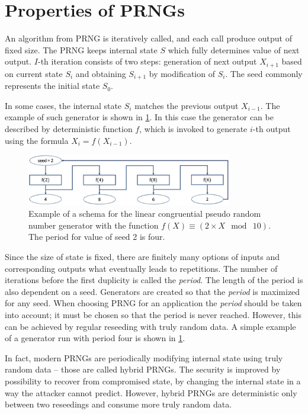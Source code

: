 \documentclass[
    digital,    %
    oneside,    %
    color,
    11pt,
    nocover,
    notable,
    nolof,
    nolot,
    final
]{fithesis3}
\renewcommand\_{\textunderscore\allowbreak}
\begin{document}
\section{Properties of PRNGs}

An algorithm from PRNG is iteratively called, and each call produce output of fixed size. The PRNG keeps internal state $S$ which fully determines value of next output. $I$-th iteration consists of two steps: generation of next output $X_{i + 1}$ based on current state $S_{i}$ and obtaining $S_{i+1}$ by modification of $S_{i}$. The seed commonly represents the initial state $S_{0}$.

In some cases, the internal state $S_i$ matches the previous output $X_{i - 1}$. The example of such generator is shown in \cref{fig:prng}. In this case the generator can be described by deterministic function $f$, which is invoked to generate $i$-th output using the formula $X_i = f(X_{i - 1})$.

\begin{figure}[h]
	\centering
	\includegraphics[width=0.8\textwidth]{./images/pictures/prng.png}
	\caption{Example of a schema for the linear congruential pseudo random number generator with the function $f(X) \equiv \left(2 \times X~\bmod~10 \right)$. The period for value of seed 2 is four.}
	\label{fig:prng}
\end{figure}

Since the size of state is fixed, there are finitely many options of inputs and corresponding outputs what eventually leads to repetitions. The number of iterations before the first duplicity is called the \textit{period}. The length of the period is also dependent on a seed. Generators are created so that the \textit{period} is maximized for any seed. When choosing PRNG for an application the \textit{period} should be taken into account; it must be chosen so that the period is never reached. However, this can be achieved by regular reseeding with truly random data. A simple example of a generator run with period four is shown in \cref{fig:prng}.

In fact, modern PRNGs are periodically modifying internal state using truly random data -- those are called hybrid PRNGs. The security is improved by possibility to recover from compromised state, by changing the internal state in a way the attacker cannot predict. However, hybrid PRNGs are deterministic only between two reseedings and consume more truly random data. \cite{krhovjak2009cryptographic}
\end{document}
